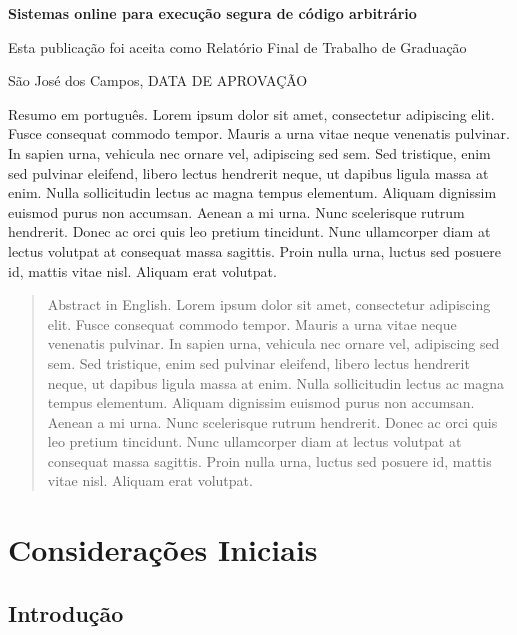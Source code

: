 \documentclass[times,ruledheader]{abnt}
\begin{document}
\folhaderosto

\begin{folhadeaprovacao}
	\setlength\ABNTsignwidth{10cm}
	\setlength\ABNTsignthickness{0.4pt}
	\setlength\ABNTsignskip{3cm}
	\begin{center}
		\textbf{Sistemas online para execução segura de código arbitrário}
		
		Esta publicação foi aceita como Relatório Final de Trabalho de Graduação
	\end{center}
	
	
	\vfill
	\begin{center}
		São José dos Campos, DATA DE APROVAÇÃO
	\end{center}
\end{folhadeaprovacao}

\begin{resumo}
Resumo em português. Lorem ipsum dolor sit amet, consectetur adipiscing elit. Fusce consequat commodo tempor. Mauris a urna vitae neque venenatis pulvinar. In sapien urna, vehicula nec ornare vel, adipiscing sed sem. Sed tristique, enim sed pulvinar eleifend, libero lectus hendrerit neque, ut dapibus ligula massa at enim. Nulla sollicitudin lectus ac magna tempus elementum. Aliquam dignissim euismod purus non accumsan. Aenean a mi urna. Nunc scelerisque rutrum hendrerit. Donec ac orci quis leo pretium tincidunt. Nunc ullamcorper diam at lectus volutpat at consequat massa sagittis. Proin nulla urna, luctus sed posuere id, mattis vitae nisl. Aliquam erat volutpat.
\end{resumo}

\begin{abstract}
Abstract in English. Lorem ipsum dolor sit amet, consectetur adipiscing elit. Fusce consequat commodo tempor. Mauris a urna vitae neque venenatis pulvinar. In sapien urna, vehicula nec ornare vel, adipiscing sed sem. Sed tristique, enim sed pulvinar eleifend, libero lectus hendrerit neque, ut dapibus ligula massa at enim. Nulla sollicitudin lectus ac magna tempus elementum. Aliquam dignissim euismod purus non accumsan. Aenean a mi urna. Nunc scelerisque rutrum hendrerit. Donec ac orci quis leo pretium tincidunt. Nunc ullamcorper diam at lectus volutpat at consequat massa sagittis. Proin nulla urna, luctus sed posuere id, mattis vitae nisl. Aliquam erat volutpat.
\end{abstract}

\tableofcontents

\listoffigures

\listoftables

\chapter{Considerações Iniciais}

\section{Introdução}
\end{document}

